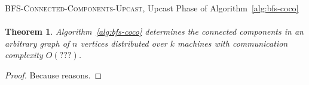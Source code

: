 \documentclass[11pt,epsf]{article}
\newtheorem{theorem}{Theorem}
\newcommand{\TODO}[0]{\textbf{\color{red}{TODO}}}
\begin{document}
{{    \begin{algorithm}
      \footnotesize
      \caption{\textsc{BFS-Connected-Components-Upcast}, Upcast Phase of Algorithm~\ref{alg:bfs-coco} }
      \label{alg:bfs-coco-upcast}
      \begin{algorithmic}
        \ENDFOR
        \ENDFOR
      \end{algorithmic}
    \end{algorithm}

    \paragraph{}{
      \TODO
    }

    \begin{theorem}
      \label{thm:bfs-coco}
      Algorithm~\ref{alg:bfs-coco} determines the connected components in an arbitrary graph
      of $n$ vertices distributed over $k$ machines with communication complexity $O(???)$.
    \end{theorem}
    \begin{proof}
      Because reasons.
    \end{proof}
  }
}
\end{document}
